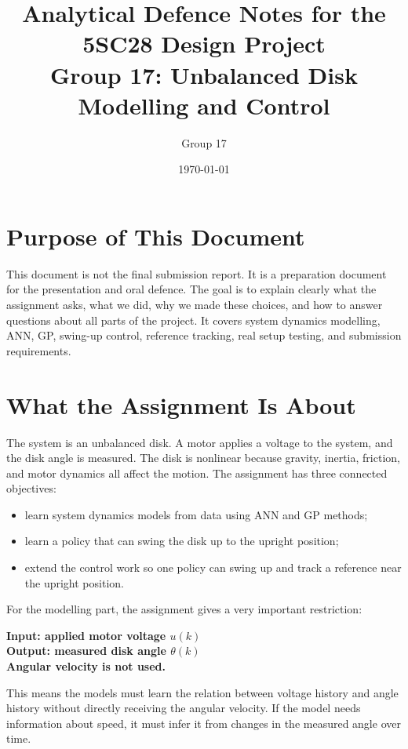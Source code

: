 \documentclass[11pt,a4paper]{article}
\title{Analytical Defence Notes for the 5SC28 Design Project\\
Group 17: Unbalanced Disk Modelling and Control}
\author{Group 17}
\date{\today}
\begin{document}
\maketitle

\section*{Purpose of This Document}

This document is not the final submission report.
It is a preparation document for the presentation and oral defence.
The goal is to explain clearly what the assignment asks, what we did, why we made these choices, and how to answer questions about all parts of the project.
It covers system dynamics modelling, ANN, GP, swing-up control, reference tracking, real setup testing, and submission requirements.

\section{What the Assignment Is About}

The system is an unbalanced disk.
A motor applies a voltage to the system, and the disk angle is measured.
The disk is nonlinear because gravity, inertia, friction, and motor dynamics all affect the motion.
The assignment has three connected objectives:

\begin{itemize}
    \item learn system dynamics models from data using ANN and GP methods;
    \item learn a policy that can swing the disk up to the upright position;
    \item extend the control work so one policy can swing up and track a reference near the upright position.
\end{itemize}

For the modelling part, the assignment gives a very important restriction:

\begin{center}
\textbf{Input: applied motor voltage $u(k)$}\\
\textbf{Output: measured disk angle $\theta(k)$}\\
\textbf{Angular velocity is not used.}
\end{center}

This means the models must learn the relation between voltage history and angle history without directly receiving the angular velocity.
If the model needs information about speed, it must infer it from changes in the measured angle over time.
\end{document}
